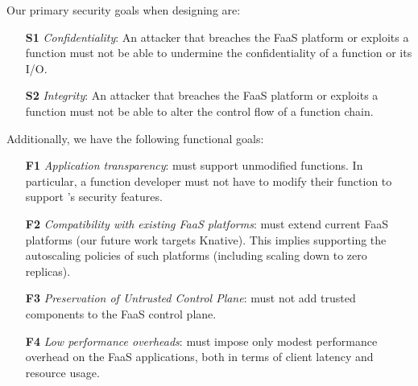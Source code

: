 %
%
Our primary security goals when designing \SystemName are:
%
\begin{itemize}
    \item[\textbf{S1}] \emph{Confidentiality}: 
        An attacker that breaches the FaaS platform or exploits a function
        must not be able to undermine the confidentiality of a function or
        its I/O\@.
    \item[\textbf{S2}] \emph{Integrity}:
        An attacker that breaches the FaaS platform or exploits a function
        must not be able to alter the control flow of a function chain.
\end{itemize}
%
Additionally, we have the following functional goals:
%
\begin{itemize}
    \item[\textbf{F1}] \emph{Application transparency}: \SystemName must
        support unmodified functions.
        In particular, a function developer must not have to modify their
        function to support \SystemName's security features.
    \item[\textbf{F2}] \emph{Compatibility with existing FaaS platforms}:
        \SystemName must extend current FaaS platforms (our future work
        targets Knative).
        This implies supporting the autoscaling policies of such platforms
        (including scaling down to zero replicas).
    \item[\textbf{F3}] \emph{Preservation of Untrusted Control Plane}:
        \SystemName must not add trusted components to the FaaS control plane.
    \item[\textbf{F4}] \emph{Low performance overheads}:
        \SystemName must impose only modest performance overhead on the
        FaaS applications, both in terms of client latency and
        resource usage.
\end{itemize}
